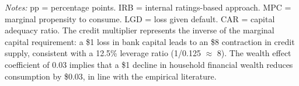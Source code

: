 \begin{table}[htbp]
\smallskip
\noindent \textit{Notes:} pp = percentage points. IRB = internal ratings-based approach. MPC = marginal propensity to consume. LGD = loss given default. CAR = capital adequacy ratio. The credit multiplier represents the inverse of the marginal capital requirement: a \$1 loss in bank capital leads to an \$8 contraction in credit supply, consistent with a 12.5\% leverage ratio (1/0.125 $\approx$ 8). The wealth effect coefficient of 0.03 implies that a \$1 decline in household financial wealth reduces consumption by \$0.03, in line with the empirical literature.
\end{table}
